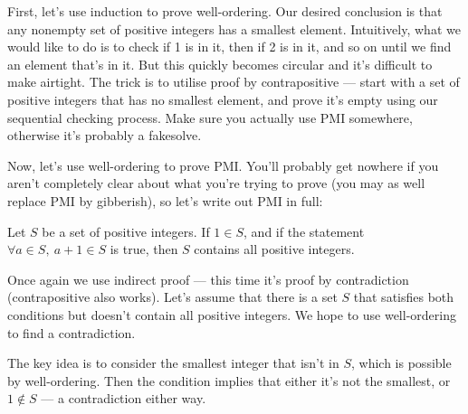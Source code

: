 \documentclass{amsart}
\begin{document}
First, let's use induction to prove well-ordering. Our desired conclusion is
that any nonempty set of positive integers has a smallest element. Intuitively,
what we would like to do is to check if 1 is in it, then if 2 is in it, and so
on until we find an element that's in it. But this quickly becomes circular
and it's difficult to make airtight. The trick is to utilise proof by
contrapositive --- start with a set of positive integers that has no smallest
element, and prove it's empty using our sequential checking process. Make sure
you actually use PMI somewhere, otherwise it's probably a fakesolve.

Now, let's use well-ordering to prove PMI\@. You'll probably get nowhere if you
aren't completely clear about what you're trying to prove (you may as well
replace PMI by gibberish), so let's write out PMI in full:

Let $S$ be a set of positive integers. If $1\in S$, and if the statement
$\forall a\in S,\ a+1\in S$ is true, then $S$ contains all positive integers.

Once again we use indirect proof --- this time it's proof by contradiction
(contrapositive also works). Let's assume that there is a set $S$ that satisfies
both conditions but doesn't contain all positive integers. We hope to use
well-ordering to find a contradiction.

The key idea is to consider the smallest integer that isn't in $S$, which is
possible by well-ordering. Then the condition implies that either it's not the
smallest, or $1\not\in S$ --- a contradiction either way.
\end{document}
